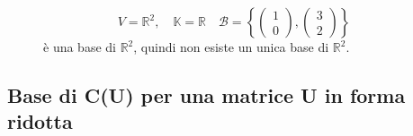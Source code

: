 \documentclass[a4paper]{article}
\theoremstyle{break}
\theoremstyle{break}
\theoremstyle{break}
\theoremstyle{break}
\begin{document}
\begin{figure}[H]
  \begin{example}
    \[
      V = \mathbb{R}^2, \quad \mathbb{K} = \mathbb{R} \quad \mathcal{B} = \left\{ \begin{pmatrix} 
          1\\0
      \end{pmatrix},
      \begin{pmatrix} 
        3\\2
      \end{pmatrix}
    \right\}
    \] 
    è una base di \( \mathbb{R}^2 \), quindi non esiste un unica base di \( \mathbb{R}^2 \).
  \end{example}
\end{figure}

\subsection{Base di C(U) per una matrice U in forma ridotta }
\end{document}
